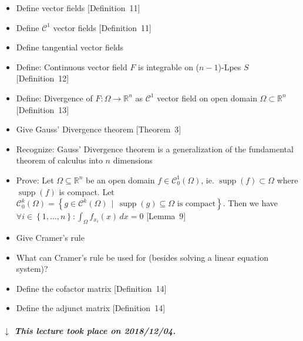\documentclass{article}
\numberwithin{lecref}{section}
\newcommand{\Set}[1]{\left\{#1\right\}}
\newcommand{\SetDef}[2]{\left\{#1\,\mid\,#2\right\}}
\newcommand{\dateref}[1]{%
  \begin{mdframed}[backgroundcolor=gray!10,innerbottommargin=0pt,innertopmargin=0pt]
    \paragraph{\textit{$\downarrow$ This lecture took place on #1.}}%
  \end{mdframed}%
}
\begin{document}
\begin{itemize}
  \item Define vector fields [Definition~11]
  \item Define $\mathcal C^1$ vector fields [Definition~11]
  \item Define tangential vector fields
  \item Define: Continuous vector field $F$ is integrable on ($n-1$)-Lpes $S$ [Definition~12]
  \item Define: Divergence of $F: \Omega \to \mathbb R^n$ as $\mathcal C^1$ vector field on open domain $\Omega \subset \mathbb R^n$ [Definition~13]
  \item Give Gauss' Divergence theorem [Theorem~3]
  \item Recognize: Gauss' Divergence theorem is a generalization of the fundamental theorem of calculus into $n$ dimensions
  \item Prove: Let $\Omega \subseteq \mathbb R^n$ be an open domain $f \in \mathcal C_0^1(\Omega)$, ie. $\operatorname{supp}(f) \subset \Omega$ where $\operatorname{supp}(f)$ is compact. Let $\mathcal C_0^k(\Omega) = \SetDef{g \in \mathcal C^k(\Omega)}{\operatorname{supp}(g) \subseteq \Omega \text{ is compact}}$. Then we have $\forall i \in \Set{1, \dots, n}: \int_\Omega f_{x_i}(x) \, dx = 0$ [Lemma~9]
  \item Give Cramer's rule
  \item What can Cramer's rule be used for (besides solving a linear equation system)?
  \item Define the cofactor matrix [Definition~14]
  \item Define the adjunct matrix [Definition~14]
\end{itemize}

\dateref{2018/12/04}
\end{document}
